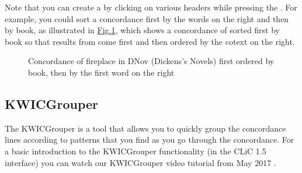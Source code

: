 \documentclass[letterpaper,10pt,english]{sphinxmanual}
\begin{document}
\sphinxAtStartPar
Note that you can create a  by clicking on various
headers while pressing the . For example, you could sort a
concordance first by the words on the right and then by book, as
illustrated in \hyperref[\detokenize{clicanalysis/concordance:figure-analysis-concordance-sorting-fireplacecombined}]{Fig.\@ \ref{\detokenize{clicanalysis/concordance:figure-analysis-concordance-sorting-fireplacecombined}}},
which shows a concordance of  sorted first by book \textendash{} so that
results from  come first \textendash{} and then ordered by the
co\sphinxhyphen{}text on the right.

\begin{figure}[htbp]
\centering
\capstart

\noindent{}
\caption{Concordance of fireplace in DNov (Dickens’s Novels) \textendash{}
first ordered by book, then by the first word on the right}\label{\detokenize{clicanalysis/concordance:id14}}\label{\detokenize{clicanalysis/concordance:figure-analysis-concordance-sorting-fireplacecombined}}\end{figure}


\subsection{KWICGrouper}
\label{\detokenize{clicanalysis/concordance:kwicgrouper}}\label{\detokenize{clicanalysis/concordance:id4}}
\sphinxAtStartPar
The KWICGrouper is a tool that allows you to quickly group the
concordance lines according to patterns that you find as you go through
the concordance. For a basic introduction to the KWICGrouper
functionality (in the CLiC 1.5 interface) you can watch our KWICGrouper
video tutorial from May 2017 .
\end{document}
